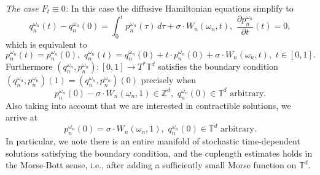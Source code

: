 \documentclass[a4paper,11pt]{amsart}
\newcommand{\ZZ}{\mathbb{Z}}
\newcommand{\TT}{\mathbb{T}}
\begin{document}
\noindent\emph{The case $F_t\equiv 0$:} In this case the diffusive Hamiltonian equations simplify to \[q_n^{\omega_n}(t)-q_n^{\omega_n}(0)=\int_0^t p_n^{\omega_n}(\tau)\,d\tau +\sigma\cdot W_n(\omega_n,t),\,\,\frac{\partial p_n^{\omega_n}}{\partial t}(t)=0,\] which is equivalent to \[p_n^{\omega_n}(t)=p_n^{\omega_n}(0),\,\, q_n^{\omega_n}(t)=q_n^{\omega_n}(0)+t\cdot p_n^{\omega_n}(0)+\sigma\cdot W_n(\omega_n,t),\,\,t\in [0,1].\] Furthermore $(q_n^{\omega_n},p_n^{\omega_n}):[0,1]\to T^*\TT^d$ satisfies the boundary condition $(q_n^{\omega_n},p_n^{\omega_n})(1)=(q_n^{\omega_n},p_n^{\omega_n})(0)$ precisely when \[p_n^{\omega_n}(0)-\sigma\cdot W_n(\omega_n,1)\in\ZZ^d,\,\,q_n^{\omega_n}(0)\in\TT^d\,\,\textrm{arbitrary.}\] Also taking into account that we are interested in contractible solutions, we arrive at \[p_n^{\omega_n}(0)=\sigma\cdot W_n(\omega_n,1),\,\,q_n^{\omega_n}(0)\in\TT^d\,\,\textrm{arbitrary.}\]
In particular, we note there is an entire manifold of stochastic time-dependent solutions satisfying the boundary condition, and the cuplength estimates holds in the Morse-Bott sense, i.e., after adding a sufficiently small Morse function on $\TT^d$.\\
\end{document}
